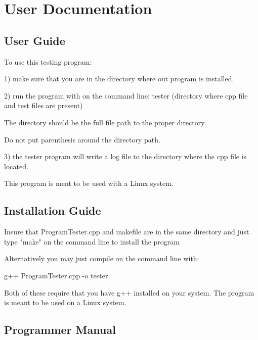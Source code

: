 
\chapter{User Documentation}



\section{User Guide}


To use this testing program:
  
 1) make sure that you are in the directory where out program is installed.
 
 2) run the program with on the command line: tester (directory where cpp file and test files are present)
 
 The directory should be the full file path to the proper directory.
 
 Do not put parenthesis around the directory path.
 
 3) the tester program will write a log file to the directory where the cpp file is located.
 
This program is ment to be used with a Linux system.

\section{Installation Guide}
Insure that ProgramTester.cpp and makefile are in the same
 directory and just type "make" on the command line to install the program
 
 Alternatively you may just compile on the command line with:
 
 g++ ProgramTester.cpp -o tester
  
 Both of these require that you have g++ installed on your system.
 The program is meant to be used on a Linux system.

\section{Programmer Manual}

